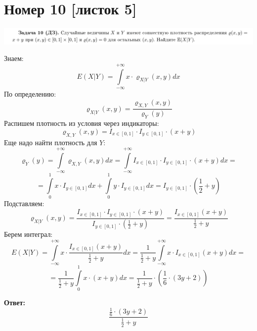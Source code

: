 \documentclass[a4paper,12pt]{article}
\begin{document}
\section*{Номер 10 [листок 5]}
\begin{center}
\includegraphics[scale=0.3]{4.png}
\end{center}
Знаем:
\[
E(X | Y) = \int\limits_{-\infty}^{+\infty} x \cdot \varrho_{X | Y}(x, y) dx
\]
По определению:
\[
 \varrho_{X | Y}(x, y) = \frac{ \varrho_{X,Y}(x, y)}{ \varrho_{Y}(y)}
\]
Распишем плотность из условия через индикаторы:
\[
\varrho_{X,Y}(x, y) = I_{x \in [0, 1]} \cdot I_{y \in [0, 1]} \cdot (x + y) 
\]
Еще надо найти плотность для $Y$:
\[
\varrho_{Y}(y) = \int\limits_{-\infty}^{+\infty} \varrho_{X, Y}(x, y) dx = \int\limits_{-\infty}^{+\infty}I_{x \in [0, 1]} \cdot I_{y \in [0, 1]} \cdot (x + y)  dx = 
\]
\[
= \int\limits_0^1 x \cdot I_{y \in [0, 1]} dx + \int\limits_0^1 y \cdot I_{y \in [0, 1]} dx = I_{y \in [0, 1]} \cdot \left(
\frac{1}{2}  + y 
\right) 
\]
Подставляем:
\[
 \varrho_{X | Y}(x, y)  = \frac{I_{x \in [0, 1]} \cdot I_{y \in [0, 1]} \cdot (x + y) }{I_{y \in [0, 1]} \cdot \left(
\frac{1}{2}  + y 
\right) } = \frac{I_{x \in [0, 1]} (x + y)}{\frac12 + y }
\]
Берем интеграл:
\[
E(X | Y) = \int\limits_{-\infty}^{+\infty} x \cdot \frac{I_{x \in [0, 1]} (x + y)}{\frac12 + y } dx = \frac{1}{\frac{1}{2} + y } \int\limits_{-\infty}^{+\infty} x \cdot I_{x \in [0, 1]} (x + y) dx = 
\]
\[
=
\frac{1}{\frac{1}{2} + y } \int\limits_{0}^{1} x \cdot (x + y) dx  = \frac{1}{\frac{1}{2} + y } \cdot \left(
\frac{1}{6} \cdot (3y + 2)
\right)
\]
\begin{center}
\textbf{Ответ: } 
\[
\frac{
\frac{1}{6} \cdot (3y + 2)
}{\frac{1}{2} + y } 
\]
\end{center}
\end{document}

